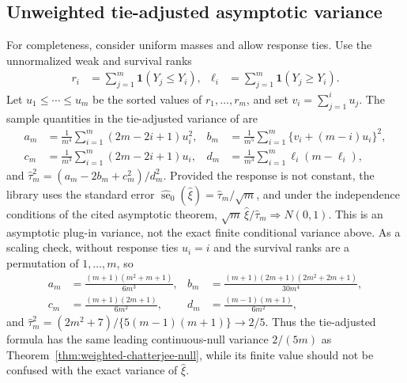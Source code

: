 \subsection{Unweighted tie-adjusted asymptotic variance}

For completeness, consider uniform masses and allow response ties. Use the
unnormalized weak and survival ranks
\begin{align*}
  r_i
  &=\sum_{j=1}^m\mathbf{1}(Y_j\leq Y_i),
  &
  \ell_i
  &=\sum_{j=1}^m\mathbf{1}(Y_j\geq Y_i).
\end{align*}
Let $u_1\leq\cdots\leq u_m$ be the sorted values of $r_1,\ldots,r_m$, and
set $v_i=\sum_{j=1}^i u_j$. The sample quantities in the tie-adjusted
variance of \citet{chatterjee2021} are
\begin{align*}
  a_m
  &=\frac1{m^4}\sum_{i=1}^m(2m-2i+1)u_i^2,
  &
  b_m
  &=\frac1{m^5}\sum_{i=1}^m
    \{v_i+(m-i)u_i\}^2,\\
  c_m
  &=\frac1{m^3}\sum_{i=1}^m(2m-2i+1)u_i,
  &
  d_m
  &=\frac1{m^3}\sum_{i=1}^m\ell_i(m-\ell_i),
\end{align*}
and $\widehat\tau_m^2=(a_m-2b_m+c_m^2)/d_m^2$. Provided the response is not
constant, the library uses the standard error
$\widehat{\operatorname{se}}_0(\widehat\xi)=\widehat\tau_m/\sqrt m$, and
under the independence conditions of the cited asymptotic theorem,
$\sqrt m\,\widehat\xi/\widehat\tau_m\Longrightarrow N(0,1)$. This is an
asymptotic plug-in variance, not the exact finite conditional variance
above. As a scaling check, without response ties $u_i=i$ and the survival
ranks are a permutation of $1,\ldots,m$, so
\begin{align*}
  a_m
  &=\frac{(m+1)(m^2+m+1)}{6m^3},
  &
  b_m
  &=\frac{(m+1)(2m+1)(2m^2+2m+1)}{30m^4},\\
  c_m
  &=\frac{(m+1)(2m+1)}{6m^2},
  &
  d_m
  &=\frac{(m-1)(m+1)}{6m^2},
\end{align*}
and $\widehat\tau_m^2=(2m^2+7)/\{5(m-1)(m+1)\}\to2/5$. Thus the
tie-adjusted formula has the same leading continuous-null variance $2/(5m)$
as Theorem~\ref{thm:weighted-chatterjee-null}, while its finite value should
not be confused with the exact variance of $\widehat\xi$.
